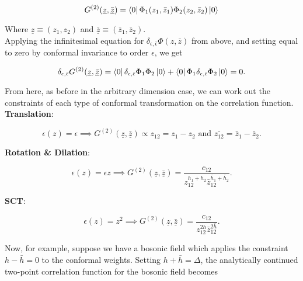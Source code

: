 \begin{equation}
G^{(2)} (\underline{z}, \bar{\underline{z}}) = \bra{0} \Phi_1 (z_1, \bar{z}_1) \Phi_2 (z_2, \bar{z}_2) \ket{0}
\end{equation}

\noindent Where $\underline{z} \equiv (z_1, z_2)$ and $\underline{\bar{z}} \equiv (\bar{z}_1, \bar{z}_2)$. \\

\noindent Applying the infinitesimal equation for $\delta_{\epsilon, \bar{\epsilon}} \Phi (z, \bar{z})$ from above, and setting equal to zero by conformal invariance to order $\epsilon$, we get

\begin{equation}
\delta_{\epsilon, \bar{\epsilon}} G^{(2)} (\underline{z}, \underline{\bar{z}}) = \bra{0} \delta_{\epsilon, \bar{\epsilon}} \Phi_1 \Phi_2 \ket{0} + \bra{0} \Phi_1 \delta_{\epsilon, \bar{\epsilon}} \Phi_2 \ket{0} = 0.
\end{equation}

\noindent From here, as before in the arbitrary dimension case, we can work out the constraints of each type of conformal transformation on the correlation function. \\

\noindent \textbf{Translation}: 

\begin{equation}
\epsilon(z) = \epsilon \implies G^{(2)}(\underline{z}, \underline{\bar{z}}) \propto z_{12} = z_1 - z_2 \text{ and }\bar{z_{12}} = \bar{z}_1 - \bar{z}_2.
\end{equation}

\noindent \textbf{Rotation \& Dilation}: 

\begin{equation}
\epsilon (z) = \epsilon z \implies G^{(2)}(\underline{z}, \underline{\bar{z}}) = \frac{c_{12}}{z_{12}^{h_1 + h_2} \bar{z}_{12}^{\bar{h}_1 + \bar{h}_2}}.
\end{equation}

\noindent \textbf{SCT}: 

\begin{equation}
\epsilon (z) = z^2 \implies G^{(2)}(\underline{z}, \underline{\bar{z}}) = \frac{c_{12}}{z_{12}^{2h} \bar{z}_{12}^{2\bar{h}}}.
\end{equation}

\noindent Now, for example, suppose we have a bosonic field which applies the constraint $h-\bar{h}=0$ to the conformal weights. Setting $h+\bar{h} = \Delta$, the analytically continued two-point correlation function for the bosonic field becomes

